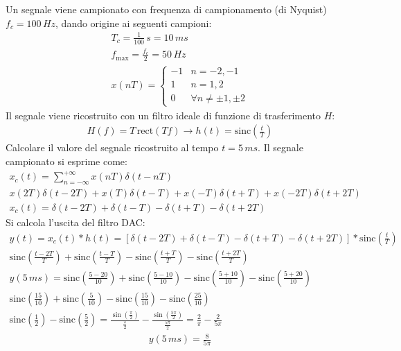 \documentclass{article}
\newcommand{\rect}{\mathrm{rect}}
\newcommand{\sinc}{\mathrm{sinc}}
\begin{document}
Un segnale viene campionato con frequenza di campionamento (di Nyquist) $f_c=100\,Hz$, dando origine ai seguenti campioni:
\begin{gather*}
    T_c=\displaystyle\frac{1}{100}\,s=10\,ms\\
    f_{\max}=\frac{f_c}{2}=50\,Hz\\
    x(nT)=\begin{cases}
        -1&n=-2,-1\\
        1&n=1,2\\
        0&\forall n\neq\pm1,\pm2
    \end{cases}
\end{gather*}
Il segnale viene ricostruito con un filtro ideale di funzione di trasferimento $H$:
\begin{gather*}
    H(f)=T\,\rect(Tf)\to  h(t)=\sinc\left(\frac{t}{T}\right)
\end{gather*} 
Calcolare il valore del segnale ricostruito al tempo $t=5\,ms$. Il segnale campionato si esprime come:
\begin{gather*}
    x_c(t)=\displaystyle\sum_{n=-\infty}^{+\infty}x(nT)\delta(t-nT)\\
    x(2T)\delta(t-2T)+x(T)\delta(t-T)+x(-T)\delta(t+T)+x(-2T)\delta(t+2T)\\
    x_c(t)=\delta(t-2T)+\delta(t-T)-\delta(t+T)-\delta(t+2T)
\end{gather*}
Si calcola l'uscita del filtro DAC:
\begin{gather*}
    y(t)=x_c(t)*h(t)=\left[\delta(t-2T)+\delta(t-T)-\delta(t+T)-\delta(t+2T)\right]*\sinc\left(\displaystyle\frac{t}{T}\right)\\
    \displaystyle\sinc\left(\frac{t-2T}{T}\right)+\sinc\left(\frac{t-T}{T}\right)-\sinc\left(\frac{t+T}{T}\right)-\sinc\left(\frac{t+2T}{T}\right)\\
    y(5\,ms)=\displaystyle\sinc\left(\frac{5-20}{10}\right)+\sinc\left(\frac{5-10}{10}\right)-\sinc\left(\frac{5+10}{10}\right)-\sinc\left(\frac{5+20}{10}\right)\\
    \displaystyle\sinc\left(\frac{15}{10}\right)+\sinc\left(\frac{5}{10}\right)-\sinc\left(\frac{15}{10}\right)-\sinc\left(\frac{25}{10}\right)\\
    \displaystyle\sinc\left(\frac{1}{2}\right)-\sinc\left(\frac{5}{2}\right)=\frac{\sin\left(\frac{\pi}{2}\right)}{\frac{\pi}{2}}-\frac{\sin\left(\frac{5\pi}{2}\right)}{\frac{5\pi}{2}}=\frac{2}{\pi}-\frac{2}{5\pi}
\end{gather*}
\begin{gather}
    y(5\,ms)=\displaystyle\frac{8}{5\pi}
\end{gather}
\end{document}
